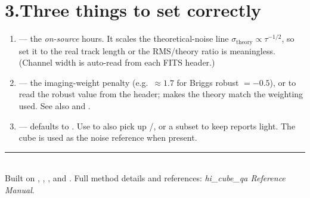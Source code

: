 \documentclass[11pt,a4paper]{article}
\begin{document}
\section*{3.\quad Three things to set correctly}

\begin{enumerate}[leftmargin=1.6em,itemsep=2pt]
  \item \textbf{} --- the \emph{on-source} hours. It
        scales the theoretical-noise line $\sigma_{\mathrm{theory}}\propto
        \tau^{-1/2}$, so set it to the real track length or the RMS/theory ratio
        is meaningless. (Channel width is auto-read from each FITS header.)
  \item \textbf{} --- the imaging-weight penalty
        (e.g.\ $\approx 1.7$ for Briggs robust $=-0.5$), or  to read
        the robust value from the header; makes the theory match the weighting
        used. See also  and .
  \item \textbf{} --- defaults to . Use  to also pick up /, or a
        subset to keep reports light. The  cube is used as the
        noise reference when present.
\end{enumerate}

\vfill
\noindent\rule{\textwidth}{0.4pt}\\[2pt]
{\footnotesize Built on , , ,
 and . Full method details and references:
\emph{hi\_cube\_qa Reference Manual}.}


\renewcommand{\refname}{\vspace{-1.5em}}
{\footnotesize}
\end{document}
